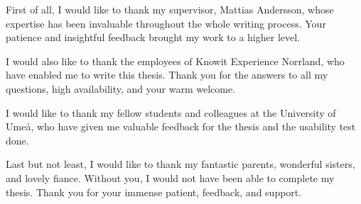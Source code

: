 First of all, I would like to thank my supervisor, Mattias Andersson, whose expertise has been invaluable throughout the whole writing process. Your patience and insightful feedback brought my work to a higher level.

I would also like to thank the employees of Knowit Experience Norrland, who have enabled me to write this thesis. Thank you for the answers to all my questions, high availability, and your warm welcome.

I would like to thank my fellow students and colleagues at the University of Umeå, who have given me valuable feedback for the thesis and the usability test done.  

Last but not least, I would like to thank my fantastic parents, wonderful sisters, and lovely fiance. Without you, I would not have been able to complete my thesis. Thank you for your immense patient, feedback, and support.
\newpage
{}

